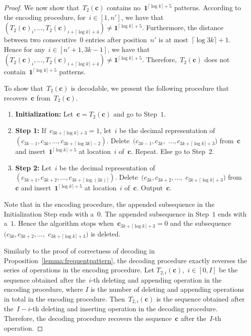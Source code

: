 \documentclass[10pt,a4paper,onecolumn]{IEEEtran}
\newcommand{\1}{\mathbbold{1}}
\newcommand{\boldc}{\mathbf{c}}
\begin{document}
\begin{proof}
We now show that~$T_2(\boldc)$ contains no~$\boldsymbol{1}^{\lceil \log k\rceil+5}$ patterns. According to the encoding procedure, for~$i\in [1,n']$, we have that~$(T_2(\boldc)_i,\ldots,T_2(\boldc)_{i+\lceil \log k\rceil+4})\ne\boldsymbol{1}^{\lceil \log k\rceil+5}$. Furthermore, the distance between two consecutive~$0$ entries after position~$n'$ is at most~$\lceil \log 3k\rceil+1$. Hence for any~$i\in [n'+1,3k-1]$, we have that
~$(T_2(\boldc)_i,\ldots,T_2(\boldc)_{i+\lceil \log k\rceil+4})\ne\boldsymbol{1}^{\lceil \log k\rceil+5}$. Therefore,~$T_2(\boldc)$ does not contain~$\boldsymbol{1}^{\lceil \log k\rceil+5}$ patterns.

To show that~$T_2(\boldc)$ is decodable,
we present the following procedure that recovers~$\boldc$ from~$T_2(\boldc)$.
\begin{enumerate}
    \item \textbf{Initialization:} Let~$\boldc=T_2(\boldc)$ and go to Step~$1$. 
    \item \textbf{Step 1:} If~$c_{3k+\lceil \log k\rceil+3}=1$, let~$i$ be the decimal representation of~$(c_{3k-1},c_{3k},\ldots,c_{3k+\lceil \log 3k \rceil-2})$. 
    Delete~$(c_{3k-1},c_{3k},$ $\ldots,c_{3k+\lceil \log k\rceil+3})$ from~$\boldc$ and insert~$\boldsymbol{1}^{\lceil \log k \rceil+5}$ at location~$i$ of~$\boldc$.
    Repeat. 
    Else go to Step~$2$.
    \item \textbf{Step 2:}
    Let~$i$ be the decimal representation of~$(c_{3k+1},c_{3k+2},\ldots,c_{3k+\lceil \log (3k) \rceil})$. 
    Delete~$(c_{3k},c_{3k+2},\ldots,$ $c_{3k+\lceil \log k\rceil+3})$ from~$\boldc$ and insert~$\boldsymbol{1}^{\lceil \log k \rceil+5}$ at location~$i$ of~$\boldc$.    
    Output~$\boldc$.
\end{enumerate}
Note that in the encoding procedure, the appended subsequence in the Initialization Step ends with a~$0$. The appended subsequence in Step~$1$ ends with a~$1$. Hence the algorithm stops when~$\boldc_{3k+\lceil \log k\rceil+3}=0$ and the subsequence~$(c_{3k},c_{3k+2},\ldots,$ $c_{3k+\lceil \log k\rceil+3})$ is deleted.







Similarly to the proof of correctness of decoding in Proposition~\ref{lemma:frequentpattern}, the decoding procedure exactly reverses the series of operations in the encoding procedure.
Let $T_{2,i}(\boldc)$,~$i\in [0,I]$ be the sequence obtained after the~$i$-th deleting and appending operation in the encoding procedure, where
$I$ is the number of deleting and appending operations in total in the encoding procedure.
Then~$T_{2,i}(\boldc)$ is the sequence obtained after the~$I-i$-th deleting and inserting operation in the decoding procedure. Therefore, the decoding procedure recovers the sequence~$\boldc$ after the~$I$-th operation. 
\end{proof}
\end{document}
